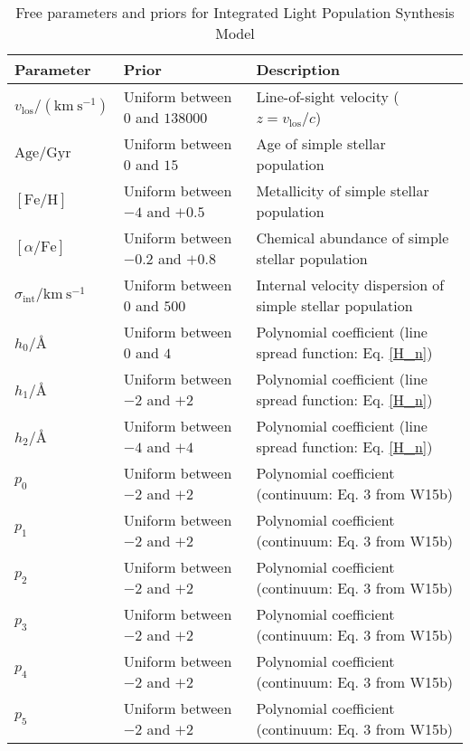\documentclass[twocolumn]{aastex6}
\def\feh{\mathrm{[Fe/H]}}
\def\afe{[\alpha/\mathrm{Fe}]}
\def\age{\mathrm{Age}}
\def\vlos{v_\mathrm{los}}
\def\disp{\sigma_\mathrm{int}}
\begin{document}
\begin{table*}
\centering
\caption{Free parameters and priors for Integrated Light Population Synthesis Model}
\begin{tabular}{ l l l }
\hline
\hline
Parameter &
Prior &
Description\\
\hline
$\vlos/\left(\mathrm{km\ s^{-1}}\right)$ & Uniform between $0$ and $138000$ & Line-of-sight velocity ($z=\vlos/c$)\\
$\age/\mathrm{Gyr}$ & Uniform between $0$ and $15$ & Age of simple stellar population\\
$\feh$ & Uniform between $-4$ and $+0.5$ & Metallicity of simple stellar population\\
$\afe$ & Uniform between $-0.2$ and $+0.8$ & Chemical abundance of simple stellar population\\
$\disp/\mathrm{km\ s^{-1}}$ & Uniform between $0$ and $500$ & Internal velocity dispersion of simple stellar population\\
$h_0/$\AA & Uniform between $0$ and $4$ & Polynomial coefficient (line spread function: Eq. \ref{H_n})\\ 
$h_1/$\AA & Uniform between $-2$ and $+2$ & Polynomial coefficient (line spread function: Eq.  \ref{H_n})\\ 
$h_2/$\AA & Uniform between $-4$ and $+4$ & Polynomial coefficient (line spread function: Eq.  \ref{H_n})\\ 
$p_0$ & Uniform between $-2$ and $+2$ & Polynomial coefficient (continuum: Eq. 3 from W15b)\\
$p_1$ & Uniform between $-2$ and $+2$ & Polynomial coefficient (continuum: Eq. 3 from W15b)\\
$p_2$ & Uniform between $-2$ and $+2$ & Polynomial coefficient (continuum: Eq. 3 from W15b)\\
$p_3$ & Uniform between $-2$ and $+2$ & Polynomial coefficient (continuum: Eq. 3 from W15b)\\
$p_4$ & Uniform between $-2$ and $+2$ & Polynomial coefficient (continuum: Eq. 3 from W15b)\\
$p_5$ & Uniform between $-2$ and $+2$ & Polynomial coefficient (continuum: Eq. 3 from W15b)\\
\hline
\end{tabular}
\label{A267Params}
\end{table*}
\end{document}
